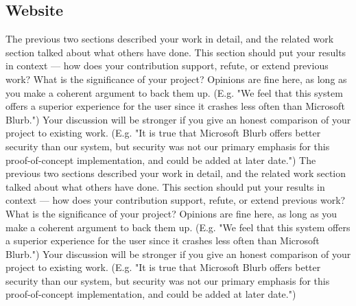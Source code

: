 \documentclass{acm_proc_article-sp}
\begin{document}
\subsection{Website}
The previous two sections described your work in detail, and the related work section talked about what others have done. This section should put your results in context — how does your contribution support, refute, or extend previous work? What is the significance of your project? Opinions are fine here, as long as you make a coherent argument to back them up. (E.g. "We feel that this system offers a superior experience for the user since it crashes less often than Microsoft Blurb.") Your discussion will be stronger if you give an honest comparison of your project to existing work. (E.g. "It is true that Microsoft Blurb offers better security than our system, but security was not our primary emphasis for this proof-of-concept implementation, and could be added at later date.") The previous two sections described your work in detail, and the related work section talked about what others have done. This section should put your results in context — how does your contribution support, refute, or extend previous work? What is the significance of your project? Opinions are fine here, as long as you make a coherent argument to back them up. (E.g. "We feel that this system offers a superior experience for the user since it crashes less often than Microsoft Blurb.") Your discussion will be stronger if you give an honest comparison of your project to existing work. (E.g. "It is true that Microsoft Blurb offers better security than our system, but security was not our primary emphasis for this proof-of-concept implementation, and could be added at later date.")
\end{document}
